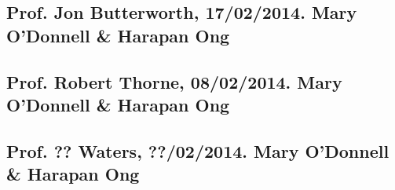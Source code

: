 \subsection{Prof. Jon Butterworth, 17/02/2014. Mary O'Donnell \& Harapan Ong} 
\label{interview:butterworth}

\subsection{Prof. Robert Thorne, 08/02/2014. Mary O'Donnell \& Harapan Ong}
\label{interview:thorne}

\subsection{Prof. ?? Waters, ??/02/2014. Mary O'Donnell \& Harapan Ong}
\label{interview:waters}
